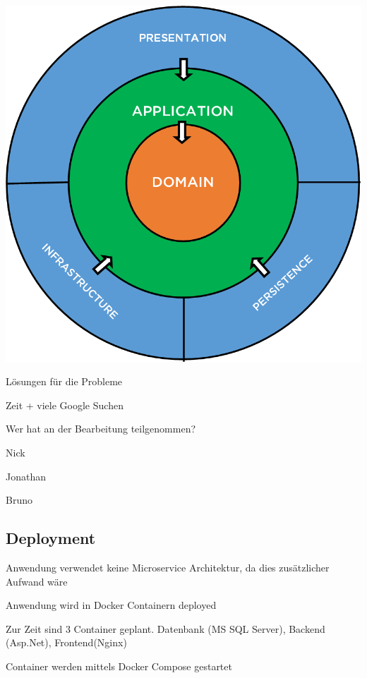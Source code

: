 \documentclass{beamer}
\begin{document}
\begin{frame}
    \includegraphics[width=\linewidth,height=\textheight,keepaspectratio]{CleanArchitecture.png}
\end{frame}
\begin{frame}
    \begin{description}[font=$\bullet$]
        \item Lösungen für die Probleme
              \begin{description}[font=$\bullet$]
                  \item Zeit + viele Google Suchen
              \end{description}
        \item Wer hat an der Bearbeitung teilgenommen?
              \begin{description}[font=$\bullet$]
                  \item Nick
                  \item Jonathan
                  \item Bruno
              \end{description}
    \end{description}
\end{frame}
\subsection{Deployment}
\begin{frame}
    \begin{description}[font=$\bullet$]
        \item Anwendung verwendet keine Microservice Architektur, da dies zusätzlicher Aufwand wäre
        \item Anwendung wird in Docker Containern deployed
        \item Zur Zeit sind 3 Container geplant. Datenbank (MS SQL Server), Backend (Asp.Net), Frontend(Nginx)
        \item Container werden mittels Docker Compose gestartet
    \end{description}
\end{frame}
\end{document}
